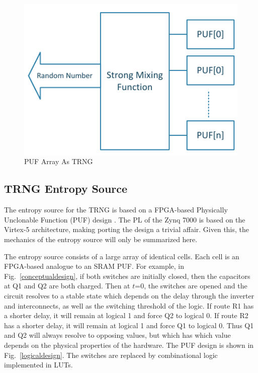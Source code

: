 \documentclass[journal]{IEEEtran}
\begin{document}
\begin{figure}[!th]
\centering
\includegraphics[scale=.75]{Images/trng.pdf}
\caption{PUF Array As TRNG }
\label{fig:trng}
\end{figure} 





\subsection{TRNG Entropy Source}

The entropy source for the TRNG is based on a FPGA-based Physically Unclonable Function (PUF) design \cite{fpga_puf}. The PL of the Zynq 7000 is based on the Virtex-5 architecture, making porting the design a trivial affair. Given this,  the mechanics of the entropy source will only be summarized here. 

The entropy source consists of a large array of identical cells. Each cell is an FPGA-based analogue to an SRAM PUF. For example, in Fig.~\ref{conceptualdesign}, if both switches are initially closed, then the capacitors at Q1 and Q2 are both charged. Then at $t$=0, the switches are opened and the circuit resolves to a stable state which depends on the  delay through the inverter and interconnects, as well as the switching threshold of the logic. If route R1 has a shorter delay, it will remain at logical 1 and force Q2 to logical 0. If route R2 has a shorter delay, it will remain at logical 1 and force Q1 to logical 0. Thus Q1 and Q2 will always resolve to opposing values, but which has which value depends on the physical properties of the hardware.  The PUF design is shown in Fig.~\ref{logicaldesign}.  The switches are replaced by combinational logic implemented in LUTs.
\end{document}
